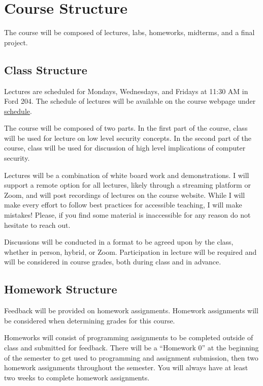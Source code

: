 \documentclass[11pt]{article}
\begin{document}

\section*{Course Structure}

The course will be composed of lectures, labs, homeworks, midterms, and a final project.

\subsection*{Class Structure}

Lectures are scheduled for Mondays, Wednesdays, and Fridays at 11:30 AM in Ford 204. The schedule
of lectures will be available on the course webpage under \href{https://cd-public.github.io/courses/computer_security/s-451f21.html}{schedule}.

\bigskip
\noindent The course will be composed of two parts. In the first part of the course, class will be used for lecture on low level security concepts. In the second part of the course, class will be used for discussion of high level implications of computer security.

\bigskip
\noindent Lectures will be a combination of white board work and demonstrations. I will support a remote option
for all lectures, likely through a streaming platform or Zoom, and will post recordings of lectures
on the course website. While I will make every effort to follow best practices for accessible teaching, I will make mistakes! Please, if you find some material is inaccessible for any reason
do not hesitate to reach out.

\bigskip
\noindent Discussions will be conducted in a format to be agreed upon by the class, whether in person, hybrid, or Zoom. Participation in lecture will be required and will be considered in course grades, both during class and in advance.


\subsection*{Homework Structure}

Feedback will be provided on homework assignments. Homework assignments will be considered when determining grades for this course.

\bigskip
\noindent Homeworks will consist of programming assignments to be completed outside of class and submitted
for feedback. There will be a ``Homework 0'' at the beginning of the semester to get used to
programming and assignment submission, then two homework assignments throughout the semester.
You will always have at least two weeks to complete homework assignments.
\end{document}
